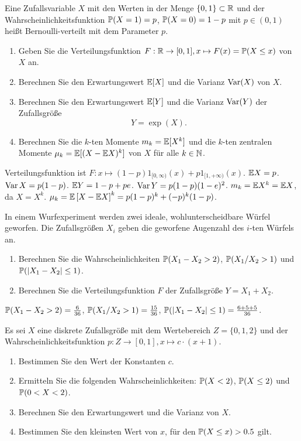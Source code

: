  Eine Zufallsvariable $X$ mit den
Werten in der Menge $\left\{ 0,1 \right\} \subset \mathbb R$ und der
Wahrscheinlichkeitsfunktion $\mathbb P(X=1)= p$, $\mathbb P(X=0)=1-p$ mit $p\in(0,1)$ heißt
Bernoulli-verteilt mit dem Parameter $p$. 
\begin{enumerate}
    \item Geben Sie die Verteilungsfunktion $F: \mathbb R\to [0,1], x\mapsto F(x) =
        \mathbb P(X\leq x)$ von $X$ an.

    \item Berechnen Sie den Erwartungswert $\mathbb E [X]$ und die Varianz $\operatorname{Var}(X)$ von $X$. 

    \item Berechnen Sie den Erwartungswert $\mathbb E [Y]$ und die Varianz $\operatorname{Var} (Y)$ der
        Zufallsgröße \[Y = \exp\left( X \right).\]

    \item Berechnen Sie die $k$-ten Momente $m_k=\mathbb E [X^k]$ und die $k$-ten
        zentralen Momente $\mu_k=\mathbb E[ (X-\mathbb E X)^k]$ von $X$ für alle $k\in
        \mathbb N$. 
\end{enumerate}

\solution Verteilungsfunktion ist $F: x\mapsto (1-p)1_{[0,\infty)}(x) + p 1_{[1,
+\infty)}(x)$. $\mathbb E X = p$. $\operatorname{Var} X = p(1-p)$. $\mathbb E Y = 1-p + p e$. $\operatorname{Var} Y =
p(1-p)(1-e)^2$. $m_k = \mathbb E X^{k} = \mathbb E X$, da $X = X^k$. $\mu_k = \mathbb E \left[ X
-\mathbb E X \right]^{k} = p(1-p)^{k} + (-p)^{k}(1-p)$.


 In einem Wurfexperiment
werden zwei ideale, wohlunterscheidbare Würfel geworfen. Die Zufallsgrößen
$X_i$ geben die geworfene Augenzahl des $i$-ten Würfels an.
\begin{enumerate}
    \item Berechnen Sie die Wahrscheinlichkeiten $\mathbb P(X_1-X_2 > 2)$, $\mathbb P(X_1/X_2 > 1)$
        und \linebreak $\mathbb P(|X_1-X_2| \leq 1)$. 
    \item Berechnen Sie die Verteilungsfunktion $F$ der Zufallsgröße $Y = X_1 + X_2$. 
\end{enumerate}

\solution $\mathbb P(X_1-X_2 > 2)=\frac{6}{36}$, $\mathbb P(X_1/X_2>1)=\frac{15}{36}$, 
$\mathbb P(|X_1-X_2| \leq 1) =\frac{6+5+5}{36}$. 


Es sei $X$ eine diskrete Zufallsgröße mit dem Wertebereich $Z=\{0,1,2\}$ und
der Wahrscheinlichkeitsfunktion $p: Z \to [0,1], x \mapsto c \cdot (x+1)$.
\begin{enumerate}
    \item Bestimmen Sie den Wert der Konstanten $c$.
    \item Ermitteln Sie die folgenden Wahrscheinlichkeiten: $\mathbb P(X<2)$, $\mathbb P(X
        \leq 2)$ und $\mathbb P(0<X<2)$. 
    \item Berechnen Sie den Erwartungswert und die Varianz von $X$.
    \item Bestimmen Sie den kleinsten Wert von $x$, für den $\mathbb P(X\leq x)>0.5$
        gilt.
\end{enumerate}

